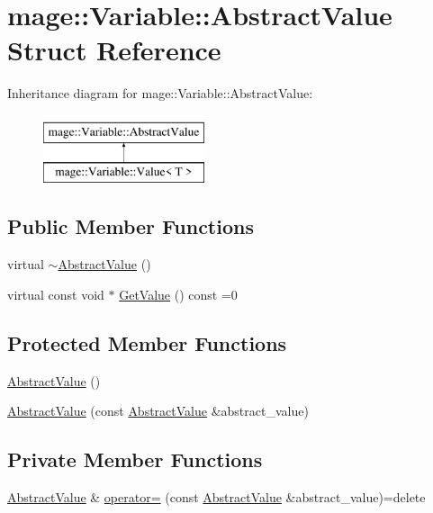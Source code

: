 \hypertarget{structmage_1_1_variable_1_1_abstract_value}{}\section{mage\+:\+:Variable\+:\+:Abstract\+Value Struct Reference}
\label{structmage_1_1_variable_1_1_abstract_value}
Inheritance diagram for mage\+:\+:Variable\+:\+:Abstract\+Value\+:\begin{figure}[H]
\begin{center}
\leavevmode
\includegraphics[height=2.000000cm]{structmage_1_1_variable_1_1_abstract_value}
\end{center}
\end{figure}
\subsection*{Public Member Functions}
\begin{DoxyCompactItemize}
\item 
virtual \hyperlink{structmage_1_1_variable_1_1_abstract_value_ae3334a01bd2e0a2ea6bd8d3530cf60eb}{$\sim$\+Abstract\+Value} ()
\item 
virtual const void $\ast$ \hyperlink{structmage_1_1_variable_1_1_abstract_value_aede2a77b571b80794a4254e34144f4c1}{Get\+Value} () const =0
\end{DoxyCompactItemize}
\subsection*{Protected Member Functions}
\begin{DoxyCompactItemize}
\item 
\hyperlink{structmage_1_1_variable_1_1_abstract_value_a1f7fb1da9789c724e41ce7c7c46889b1}{Abstract\+Value} ()
\item 
\hyperlink{structmage_1_1_variable_1_1_abstract_value_ad6ffb70859701161c192b723bc33d588}{Abstract\+Value} (const \hyperlink{structmage_1_1_variable_1_1_abstract_value}{Abstract\+Value} \&abstract\+\_\+value)
\end{DoxyCompactItemize}
\subsection*{Private Member Functions}
\begin{DoxyCompactItemize}
\item 
\hyperlink{structmage_1_1_variable_1_1_abstract_value}{Abstract\+Value} \& \hyperlink{structmage_1_1_variable_1_1_abstract_value_a77f7107e78716a0ea76cfaedd0a50a4b}{operator=} (const \hyperlink{structmage_1_1_variable_1_1_abstract_value}{Abstract\+Value} \&abstract\+\_\+value)=delete
\end{DoxyCompactItemize}


